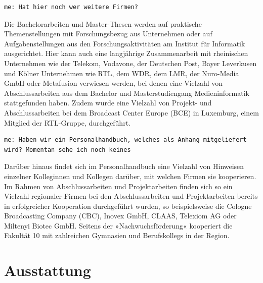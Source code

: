 \begin{verbatim}
me: Hat hier noch wer weitere Firmen?
\end{verbatim}

Die Bachelorarbeiten und Master-Thesen werden auf praktische
Themenstellungen mit Forschungsbezug aus Unternehmen oder auf
Aufgabenstellungen aus den Forschungsaktivitäten am Institut für
Informatik ausgerichtet. Hier kann auch eine langjährige Zusammenarbeit
mit rheinischen Unternehmen wie der Telekom, Vodavone, der Deutschen
Post, Bayer Leverkusen und Kölner Unternehmen wie RTL, dem WDR, dem LMR,
der Nuro-Media GmbH oder Metafusion verwiesen werden, bei denen eine
Vielzahl von Abschlussarbeiten aus dem Bachelor und Masterstudiengang
Medieninformatik stattgefunden haben. Zudem wurde eine Vielzahl von
Projekt- und Abschlussarbeiten bei dem Broadcast Center Europe (BCE) in
Luxemburg, einem Mitglied der RTL-Gruppe, durchgeführt.

\begin{verbatim}
me: Haben wir ein Personalhandbuch, welches als Anhang mitgeliefert wird? Momentan sehe ich noch keines
\end{verbatim}

Darüber hinaus findet sich im Personalhandbuch eine Vielzahl von
Hinweisen einzelner Kolleginnen und Kollegen darüber, mit welchen Firmen
sie kooperieren. Im Rahmen von Abschlussarbeiten und Projektarbeiten
finden sich so ein Vielzahl regionaler Firmen bei den Abschlussarbeiten
und Projektarbeiten bereits in erfolgreicher Kooperation durchgeführt
wurden, so beispielsweise die Cologne Broadcasting Company (CBC), Inovex
GmbH, CLAAS, Telexiom AG oder Miltenyi Biotec GmbH. Seitens der
»Nachwuchsförderung« kooperiert die Fakultät 10 mit zahlreichen
Gymnasien und Berufskollegs in der Region.

\chapter{Ausstattung}\label{ausstattung}

